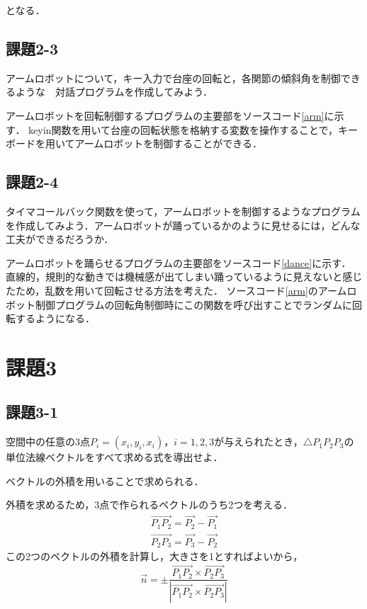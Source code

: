 \documentclass[twocolumn]{jsarticle}
\begin{document}
となる．

\subsection{課題2-3}
アームロボットについて，キー入力で台座の回転と，各関節の傾斜角を制御できるような　対話プログラムを作成してみよう．

アームロボットを回転制御するプログラムの主要部をソースコード\ref{arm}に示す．
keyin関数を用いて台座の回転状態を格納する変数を操作することで，キーボードを用いてアームロボットを制御することができる．



\subsection{課題2-4}
タイマコールバック関数を使って，アームロボットを制御するようなプログラムを作成してみよう．アームロボットが踊っているかのように見せるには，どんな工夫ができるだろうか．

アームロボットを踊らせるプログラムの主要部をソースコード\ref{dance}に示す．
直線的，規則的な動きでは機械感が出てしまい踊っているように見えないと感じたため，乱数を用いて回転させる方法を考えた．
ソースコード\ref{arm}のアームロボット制御プログラムの回転角制御時にこの関数を呼び出すことでランダムに回転するようになる．

\section{課題3}
\subsection{課題3-1}
空間中の任意の3点$P_i=(x_i,y_i,x_i)，i=1,2,3$が与えられたとき，$\triangle{P_1P_2P_3}$の単位法線ベクトルをすべて求める式を導出せよ．

ベクトルの外積を用いることで求められる．

外積を求めるため，3点で作られるベクトルのうち2つを考える．
\begin{eqnarray}
\overrightarrow{P_1P_2} = \vec{P_2} - \vec{P_1}\nonumber\\
\overrightarrow{P_2P_3} = \vec{P_3} - \vec{P_2}\nonumber
\end{eqnarray}
この2つのベクトルの外積を計算し，大きさを1とすればよいから，
\begin{equation}
\vec{n}=\pm\frac{\overrightarrow{P_1P_2} \times \overrightarrow{P_2P_3}}{|\overrightarrow{P_1P_2} \times \overrightarrow{P_2P_3}|}\nonumber
\end{equation}
\end{document}
